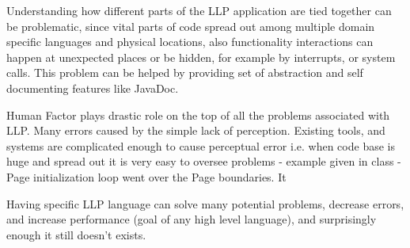 \documentclass{article}
\begin{document}
        Understanding how different parts of the LLP application are tied together can be
        problematic, since vital parts of code spread out among multiple domain specific
        languages and physical locations, also functionality interactions can happen at
        unexpected places or be hidden, for example by interrupts, or system calls. This problem can
        be helped by providing set of abstraction and self documenting features like JavaDoc.
        

        Human Factor plays drastic role on the top of all the problems associated with LLP.
        Many errors caused by the simple lack of perception. Existing tools, and systems are
        complicated enough to
        cause perceptual error i.e. when code base is huge and spread out it is very easy to oversee
        problems - example given in class - Page initialization loop went over the Page boundaries. It



        \vspace{0.5cm}
        Having specific LLP language can solve many potential problems, decrease errors, and
        increase performance (goal of any high level language), and surprisingly enough it still
        doesn't exists.
       

\end{document}
